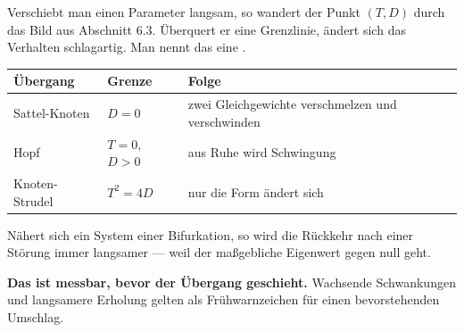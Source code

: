 \begin{merksatz}
Verschiebt man einen Parameter langsam, so wandert der Punkt $(T,D)$ durch das Bild aus Abschnitt 6.3. Überquert er eine Grenzlinie, ändert sich das Verhalten schlagartig. Man nennt das eine .

\begin{center}
{\small
\renewcommand{\arraystretch}{1.5}
\begin{tabular}{@{}P{2.6cm}P{2.6cm}P{3.0cm}@{}}
\toprule
\textbf{Übergang} & \textbf{Grenze} & \textbf{Folge}\\
\midrule
Sattel-Knoten & $D = 0$ & zwei Gleichgewichte verschmelzen und verschwinden\\
Hopf & $T = 0$, $D>0$ & \textcolor{akzent}{aus Ruhe wird Schwingung}\\
Knoten-Strudel & $T^2 = 4D$ & nur die Form ändert sich\\
\bottomrule
\end{tabular}}
\end{center}

\begin{center}
\begin{minipage}{0.88\textwidth}
\end{minipage}
\end{center}
\end{merksatz}

\begin{warnung}
Nähert sich ein System einer Bifurkation, so wird die Rückkehr nach einer Störung immer langsamer --- weil der maßgebliche Eigenwert gegen null geht.

\begin{center}
\begin{minipage}{0.9\textwidth}
\textbf{Das ist messbar, bevor der Übergang geschieht.} Wachsende Schwankungen und langsamere Erholung gelten als Frühwarnzeichen für einen bevorstehenden Umschlag.
\end{minipage}
\end{center}

\begin{center}
\begin{minipage}{0.88\textwidth}
\end{minipage}
\end{center}
\end{warnung}

